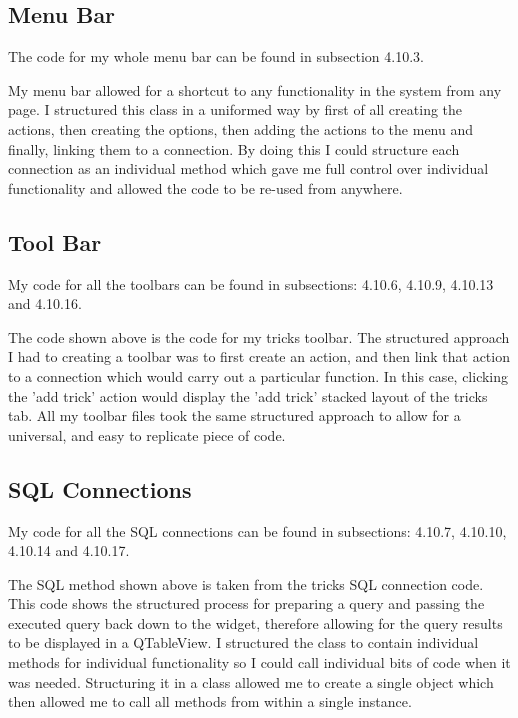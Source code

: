 \begin{landscape}
\subsection{Menu Bar}

The code for my whole menu bar can be found in subsection 4.10.3.



My menu bar allowed for a shortcut to any functionality in the system from any page. I structured this class in a uniformed way by first of all creating the actions, then creating the options, then adding the actions to the menu and finally, linking them to a connection. By doing this I could structure each connection as an individual method which gave me full control over individual functionality and allowed the code to be re-used from anywhere.

\subsection{Tool Bar}

My code for all the toolbars can be found in subsections: 4.10.6, 4.10.9, 4.10.13 and 4.10.16.


The code shown above is the code for my tricks toolbar. The structured approach I had to creating a toolbar was to first create an action, and then link that action to a connection which would carry out a particular function. In this case, clicking the 'add trick' action would display the 'add trick' stacked layout of the tricks tab. All my toolbar files took the same structured approach to allow for a universal, and easy to replicate piece of code.

\subsection{SQL Connections}

My code for all the SQL connections can be found in subsections: 4.10.7, 4.10.10, 4.10.14 and 4.10.17.


The SQL method shown above is taken from the tricks SQL connection code. This code shows the structured process for preparing a query and passing the executed query back down to the widget, therefore allowing for the query results to be displayed in a QTableView. I structured the class to contain individual methods for individual functionality so I could call individual bits of code when it was needed. Structuring it in a class allowed me to create a single object which then allowed me to call all methods from within a single instance.


\end{landscape}
